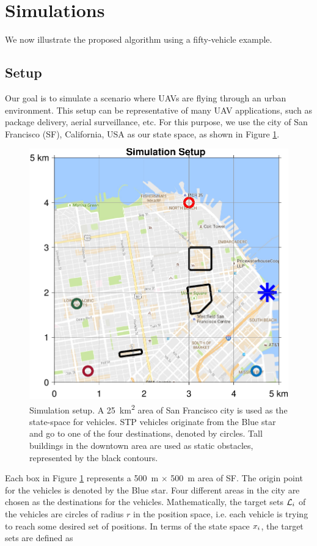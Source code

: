 \section{Simulations \label{sec:simulations}}
We now illustrate the proposed algorithm using a fifty-vehicle example. 

\subsection{Setup \label{sec:simSetup}}
Our goal is to simulate a scenario where UAVs are flying through an urban environment. This setup can be representative of many UAV applications, such as package delivery, aerial surveillance, etc. For this purpose, we use the city of San Francisco (SF), California, USA as our state space, as shown in Figure \ref{fig:sf_setup}. 
\begin{figure}[H]
  \centering
  \includegraphics[width=\columnwidth]{"figs/sf_setup"}
  \caption{Simulation setup. A \SI{25}{\km\squared} area of San Francisco city is used as the state-space for vehicles. STP vehicles originate from the Blue star and go to one of the four destinations, denoted by circles. Tall buildings in the downtown area are used as static obstacles, represented by the black contours.}
  \label{fig:sf_setup}
\end{figure}
Each box in Figure \ref{fig:sf_setup} represents a \SI{500}{\m} $\times$ \SI{500}{\m} area of SF. The origin point for the vehicles is denoted by the Blue star. Four different areas in the city are chosen as the destinations for the vehicles. Mathematically, the target sets $\mathcal{L}_i$ of the vehicles are circles of radius $r$ in the position space, i.e. each vehicle is trying to reach some desired set of positions. In terms of the state space $x_i$, the target sets are defined as
